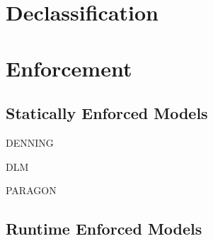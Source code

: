 \section{Declassification}

\section{Enforcement}

\subsection{Statically Enforced Models}

DENNING

DLM

PARAGON

\subsection{Runtime Enforced Models}




%
%


